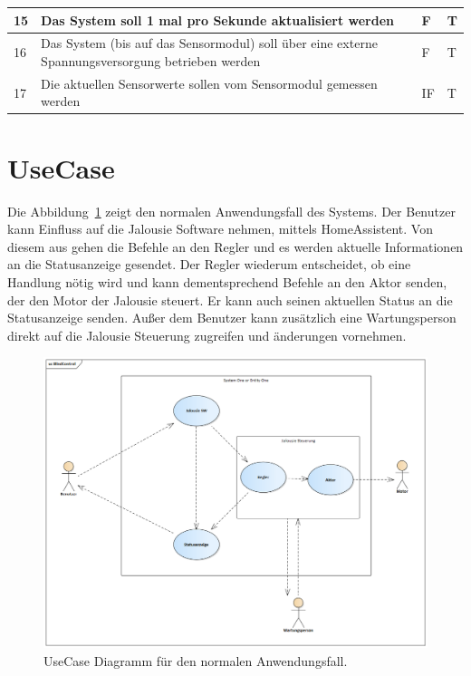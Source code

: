 \begin{longtable}[ht]{p{}  p{} p{} p{}}
	15 & Das System soll 1 mal pro Sekunde aktualisiert werden                                                                                                                                      & F& T                                   \\* \midrule
	16 & Das System (bis auf das Sensormodul) soll über eine externe Spannungsversorgung betrieben werden                                                                                                                                     & F& T                                   \\* \midrule
	17 & Die aktuellen Sensorwerte sollen vom Sensormodul gemessen werden                                                                                                                                      & IF& T                                   \\* \bottomrule
\end{longtable}

\section{UseCase}
Die Abbildung~\ref{fig:UseCase} zeigt den normalen Anwendungsfall des Systems. Der Benutzer kann Einfluss auf die Jalousie Software nehmen, mittels HomeAssistent. Von diesem aus gehen die Befehle an den Regler und es werden aktuelle Informationen an die Statusanzeige gesendet. Der Regler wiederum entscheidet, ob eine Handlung nötig wird und kann dementsprechend Befehle an den Aktor senden, der den Motor der Jalousie steuert. Er kann auch seinen aktuellen Status an die Statusanzeige senden. Außer dem Benutzer kann zusätzlich eine Wartungsperson direkt auf die Jalousie Steuerung zugreifen und änderungen vornehmen.
\begin{figure}[hbt]
	\centering
	\includegraphics[width=1\linewidth]{images/UseCase}
	\caption[UseCase Diagramm]{UseCase Diagramm für den normalen Anwendungsfall.}
	\label{fig:UseCase}
\end{figure}